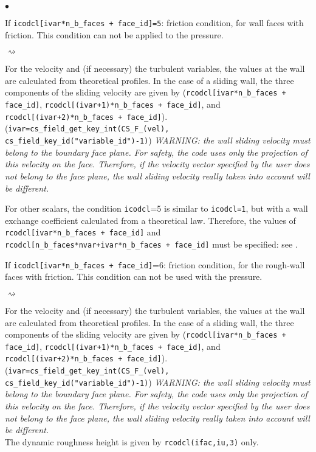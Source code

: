 \begin{list}{$\bullet$}{}
\item If \texttt{icodcl[ivar*n\_b\_faces + face\_id]=5}: friction condition, for wall faces
      with friction. This condition can not be applied to the pressure.
\begin{list}{$\rightsquigarrow$}{}
\item For the velocity and (if necessary) the turbulent variables, the
      values at the wall are calculated from theoretical profiles. In
      the case of a sliding wall, the three components of the sliding
      velocity are given by (\texttt{rcodcl[ivar*n\_b\_faces + face\_id]},
      \texttt{rcodcl[(ivar+1)*n\_b\_faces + face\_id]}, and \\\texttt{rcodcl[(ivar+2)*n\_b\_faces + face\_id]}).\\
      (\texttt{ivar=cs\_field\_get\_key\_int(CS\_F\_(vel), cs\_field\_key\_id("variable\_id")-1)})
{\em WARNING: the wall sliding velocity must belong to the boundary face
      plane. For safety, the code uses only the projection of this
      velocity on the face. Therefore, if the velocity vector specified
      by the user does not belong to the face plane, the wall sliding velocity really
      taken into account will be different.}

\item For other scalars, the condition \texttt{icodcl}=5 is similar to
      \texttt{icodcl=1}, but with a wall exchange coefficient calculated from a
      theoretical law. Therefore, the values of \\\texttt{rcodcl[ivar*n\_b\_faces + face\_id]} and
      \texttt{rcodcl[n\_b\_faces*nvar+ivar*n\_b\_faces + face\_id]} must be specified: see \cite{theory}.
\end{list}

\item If \texttt{icodcl[ivar*n\_b\_faces + face\_id]}=6: friction condition, for the rough-wall faces
      with friction. This condition can not be used with the pressure.
\begin{list}{$\rightsquigarrow$}{}
\item For the velocity and (if necessary) the turbulent variables, the
      values at the wall are calculated from theoretical profiles. In
      the case of a sliding wall, the three components of the sliding
      velocity are given by (\texttt{rcodcl[ivar*n\_b\_faces + face\_id]},
      \texttt{rcodcl[(ivar+1)*n\_b\_faces + face\_id]}, and \\\texttt{rcodcl[(ivar+2)*n\_b\_faces + face\_id]}).\\
      (\texttt{ivar=cs\_field\_get\_key\_int(CS\_F\_(vel), cs\_field\_key\_id("variable\_id")-1)})
      {\em WARNING: the wall sliding velocity must belong to the boundary face
      plane. For safety, the code uses only the projection of this
      velocity on the face. Therefore, if the velocity vector specified
      by the user does not belong to the face plane, the wall sliding velocity really
      taken into account will be different.}\\
      The dynamic roughness height is given by \texttt{rcodcl(ifac,iu,3)} only.


\end{list}
\end{list}
